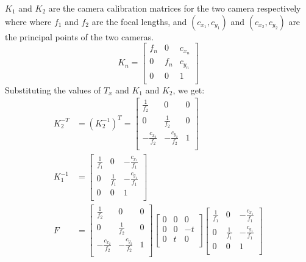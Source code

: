 \documentclass{article}
\begin{document}
$K_1$ and $K_2$ are the camera calibration matrices for the two camera respectively where where $f_1$ and $f_2$ are the focal lengths, and $(c_{x_1}, c_{y_1})$ and $(c_{x_2}, c_{y_2})$ are the principal points of the two cameras.
\begin{equation*}
    K_n= \begin{bmatrix}
        f_n & 0 & c_{x_n}\\
        0 & f_n & c_{y_n}\\
        0 & 0 & 1\\
        \end{bmatrix}
\end{equation*}
Substituting the values of $T_x$ and $K_1$ and $K_2$, we get:
\begin{align*}
K_2^{-T} &= (K_2^{-1})^T = \begin{bmatrix}
    \frac{1}{f_2} & 0 & 0 \\
    0 & \frac{1}{f_2} & 0\\
    -\frac{c_{x_2}}{f_2} &  -\frac{c_{y_2}}{f_2} & 1 \\
    \end{bmatrix}\\
K_1^{-1}&=\begin{bmatrix}
    \frac{1}{f_1} & 0 & -\frac{c_{x_1}}{f_1} \\
    0 & \frac{1}{f_1} & -\frac{c_{y_1}}{f_1} \\
    0 & 0 & 1 \\
    \end{bmatrix}\\
F &= \begin{bmatrix}
    \frac{1}{f_2} & 0 & 0 \\
    0 & \frac{1}{f_2} & 0\\
    -\frac{c_{x_2}}{f_2} &  -\frac{c_{y_2}}{f_2} & 1 \\
    \end{bmatrix}
    \begin{bmatrix}
    0 & 0 & 0 \\
    0 & 0 & -t \\
    0 & t & 0 \\
    \end{bmatrix}
    \begin{bmatrix}
    \frac{1}{f_1} & 0 & -\frac{c_{x_1}}{f_1} \\
    0 & \frac{1}{f_1} & -\frac{c_{y_1}}{f_1} \\
    0 & 0 & 1 \\
    \end{bmatrix} \\

\end{align*}
\end{document}
